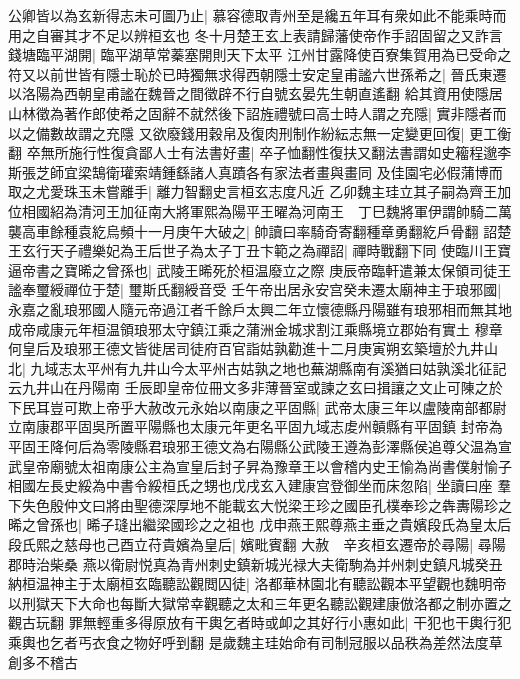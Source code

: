 公卿皆以為玄新得志未可圖乃止|{
	慕容德取青州至是纔五年耳有衆如此不能乘時而用之自審其才不足以辨桓玄也}
冬十月楚王玄上表請歸藩使帝作手詔固留之又詐言錢塘臨平湖開|{
	臨平湖草常蓁塞開則天下太平}
江州甘露降使百寮集賀用為已受命之符又以前世皆有隱士恥於已時獨無求得西朝隱士安定皇甫謐六世孫希之|{
	晉氏東遷以洛陽為西朝皇甫謐在魏晉之間徵辟不行自號玄晏先生朝直遙翻}
給其資用使隱居山林徵為著作郎使希之固辭不就然後下詔旌禮號曰高士時人謂之充隱|{
	實非隱者而以之備數故謂之充隱}
又欲廢錢用穀帛及復肉刑制作紛紜志無一定變更回復|{
	更工衡翻}
卒無所施行性復貪鄙人士有法書好畫|{
	卒子恤翻性復扶又翻法書謂如史籕程邈李斯張芝師宜梁鵠衛瓘索靖鍾繇諸人真蹟各有家法者畫與畫同}
及佳園宅必假蒲博而取之尤愛珠玉未嘗離手|{
	離力智翻史言桓玄志度凡近}
乙卯魏主珪立其子嗣為齊王加位相國紹為清河王加征南大將軍熙為陽平王曜為河南王　丁巳魏將軍伊謂帥騎二萬襲高車餘種袁紇烏頻十一月庚午大破之|{
	帥讀曰率騎奇寄翻種章勇翻紇戶骨翻}
詔楚王玄行天子禮樂妃為王后世子為太子丁丑卞範之為禪詔|{
	禪時戰翻下同}
使臨川王寶逼帝書之寶晞之曾孫也|{
	武陵王晞死於桓温廢立之際}
庚辰帝臨軒遣兼太保領司徒王謐奉璽綬禪位于楚|{
	璽斯氏翻綬音受}
壬午帝出居永安宫癸未遷太廟神主于琅邪國|{
	永嘉之亂琅邪國人隨元帝過江者千餘戶太興二年立懷德縣丹陽雖有琅邪相而無其地成帝咸康元年桓温領琅邪太守鎮江乘之蒲洲金城求割江乘縣境立郡始有實土}
穆章何皇后及琅邪王德文皆徙居司徒府百官詣姑孰勸進十二月庚寅朔玄築壇於九井山北|{
	九域志太平州有九井山今太平州古姑孰之地也蕪湖縣南有溪猶曰姑孰溪北征記云九井山在丹陽南}
壬辰即皇帝位冊文多非薄晉室或諫之玄曰揖讓之文止可陳之於下民耳豈可欺上帝乎大赦改元永始以南康之平固縣|{
	武帝太康三年以盧陵南部都尉立南康郡平固吳所置平陽縣也太康元年更名平固九域志䖍州贑縣有平固鎮}
封帝為平固王降何后為零陵縣君琅邪王德文為右陽縣公武陵王遵為彭澤縣侯追尊父温為宣武皇帝廟號太祖南康公主為宣皇后封子昇為豫章王以會稽内史王愉為尚書僕射愉子相國左長史綏為中書令綏桓氏之甥也戊戌玄入建康宫登御坐而床忽陷|{
	坐讀曰座}
羣下失色殷仲文曰將由聖德深厚地不能載玄大悦梁王珍之國臣孔樸奉珍之犇夀陽珍之晞之曾孫也|{
	晞子㻱出繼梁國珍之之祖也}
戊申燕王熙尊燕主垂之貴嬪段氏為皇太后段氏熙之慈母也己酉立苻貴嬪為皇后|{
	嬪毗賓翻}
大赦　辛亥桓玄遷帝於尋陽|{
	尋陽郡時治柴桑}
燕以衛尉悦真為青州刺史鎮新城光禄大夫衛駒為并州刺史鎮凡城癸丑納桓温神主于太廟桓玄臨聽訟觀閲囚徒|{
	洛都華林園北有聽訟觀本平望觀也魏明帝以刑獄天下大命也每斷大獄常幸觀聽之太和三年更名聽訟觀建康倣洛都之制亦置之觀古玩翻}
罪無輕重多得原放有干輿乞者時或卹之其好行小惠如此|{
	干犯也干輿行犯乘輿也乞者丐衣食之物好呼到翻}
是歲魏主珪始命有司制冠服以品秩為差然法度草創多不稽古

